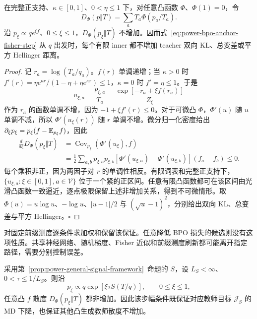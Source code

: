\begin{theorem}
\label{thm:power-bpo-inner-all-f}
在完整正支持、$\kappa\in[0,1]$、$0<\eta\le1$ 下，对任意凸函数 $\Phi$、$\Phi(1)=0$，令
\begin{equation}
 D_\Phi(p\Vert T)=\sum_aT_a\Phi(p_a/T_a).
\end{equation}
沿 $p_\xi\propto qe^{\xi f}$、$0\le\xi\le1$，$D_\Phi(p_\xi\Vert T)$ 不增加。因而式~\eqref{eq:power-bpo-anchor-fisher-step} 从 $q$ 出发时，每个有限 inner 都不增加 teacher 双向 KL、总变差或平方 Hellinger 距离。
\end{theorem}

\begin{proof}
记 $r_a=\log(T_a/q_a)$。$f(r)$ 单调递增；当 $\kappa>0$ 时 $f'(r)=\eta e^{\kappa r}/(1-\eta+\eta e^{\kappa r})\le1$，$\kappa=0$ 时 $f'=\eta\le1$。于是
\begin{equation}
 u_{\xi,a}=\frac{p_{\xi,a}}{T_a}
 =\frac{\exp[-r_a+\xi f(r_a)]}{Z_\xi}
\end{equation}
作为 $r_a$ 的函数单调不增，因为 $-1+\xi f'(r)\le0$。对于可微凸 $\Phi$，$\Phi'(u)$ 随 $u$ 单调不减，所以 $\Phi'(u_\xi(r))$ 随 $r$ 单调不增。微分归一化密度给出 $\partial_\xi p_\xi=p_\xi(f-\mathbb E_{p_\xi}f)$，因此
\begin{align}
 \frac{d}{d\xi}D_\Phi(p_\xi\Vert T)
 &=\operatorname{Cov}_{p_\xi}(\Phi'(u_\xi),f)\\
 &=\frac12\sum_{a,b}p_{\xi,a}p_{\xi,b}
   [\Phi'(u_{\xi,a})-\Phi'(u_{\xi,b})](f_a-f_b)
 \le0.
\end{align}
每个乘积非正，因为两因子对 $r$ 的单调性相反。有限词表和完整正支持下，$\{u_{\xi,a}:\xi\in[0,1],a\in\mathcal V\}$ 位于一个紧的正区间。任意有限凸函数都可在该区间由光滑凸函数一致逼近，逐点极限保留上述非增加关系，得到不可微情形。取 $\Phi(u)=u\log u$、$-\log u$、$|u-1|/2$ 与 $(\sqrt u-1)^2$，分别给出双向 KL、总变差与平方 Hellinger。\hfill$\square$
\end{proof}

对固定前缀测度逐条件求加权和保留该保证。任意降低 BPO 损失的候选则没有这项性质。共享神经网络、随机梯度、Fisher 近似和前缀测度刷新都可能离开指定路径，需要分别控制误差。

\begin{corollary}
\label{cor:power-general-signal-all-f}
采用第~\ref{prop:power-general-signal-framework}~命题的 $S$，设 $L_S<\infty$、$0<\tau\le1/L_S$。则沿
\begin{equation}
 p_\xi\propto q\exp[\xi\tau S(T/q)],\qquad0\le\xi\le1,
\end{equation}
任意凸 $f$ 散度 $D_\Phi(p_\xi\Vert T)$ 都非增加。因此该步幅条件既保证对应教师目标 $\mathcal J_S$ 的 MD 下降，也保证其他凸生成教师散度不增加。
\end{corollary}

